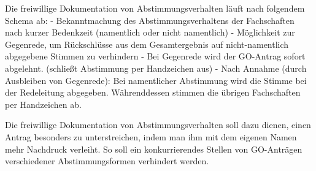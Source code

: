 \documentclass[
  a4paper,
  oneside]{scrartcl}
\begin{document}
Die freiwillige Dokumentation von Abstimmungsverhalten läuft nach
folgendem Schema ab: - Bekanntmachung des Abstimmungsverhaltens der
Fachschaften nach kurzer Bedenkzeit (namentlich oder nicht namentlich) -
Möglichkeit zur Gegenrede, um Rückschlüsse aus dem Gesamtergebnis auf
nicht-namentlich abgegebene Stimmen zu verhindern - Bei Gegenrede wird
der GO-Antrag sofort abgelehnt. (schließt Abstimmung per Handzeichen
aus) - Nach Annahme (durch Ausbleiben von Gegenrede): Bei namentlicher
Abstimmung wird die Stimme bei der Redeleitung abgegeben. Währenddessen
stimmen die übrigen Fachschaften per Handzeichen ab.

Die freiwillige Dokumentation von Abstimmungsverhalten soll dazu dienen,
einen Antrag besonders zu unterstreichen, indem man ihm mit dem eigenen
Namen mehr Nachdruck verleiht. So soll ein konkurrierendes Stellen von
GO-Anträgen verschiedener Abstimmungsformen verhindert werden.
\end{document}

